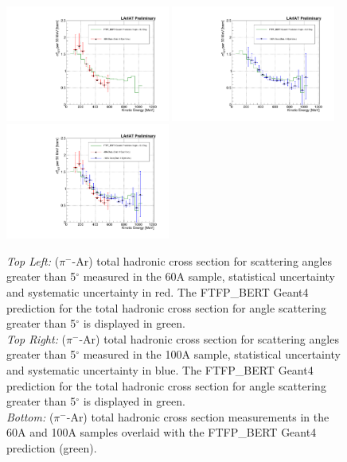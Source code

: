 \begin{figure}[htb]
\centering
\includegraphics[width=0.48\textwidth]{Chapter-6/Images/TheMoneyPlot60A.pdf}
\includegraphics[width=0.48\textwidth]{Chapter-6/Images/TheMoneyPlot100A.pdf}
\includegraphics[width=0.48\textwidth]{Chapter-6/Images/TheMoneyPlot.pdf}
\caption{ \emph{Top Left:} ($\pi^-$-Ar) total hadronic cross section for  scattering angles greater than 5$^\circ$ measured in the 60A sample, statistical uncertainty and systematic uncertainty in red. The FTFP\_BERT  Geant4 prediction for the total hadronic cross section for angle scattering greater than 5$^\circ$ is displayed in green. \\ 
\emph{Top Right:} ($\pi^-$-Ar) total hadronic cross section for  scattering angles greater than 5$^\circ$ measured in the 100A sample, statistical uncertainty and systematic uncertainty in blue. The FTFP\_BERT  Geant4 prediction for the total hadronic cross section for angle scattering greater than 5$^\circ$ is displayed in green.\\
\emph{Bottom:} ($\pi^-$-Ar) total hadronic cross section measurements in the 60A and 100A samples overlaid with the  FTFP\_BERT Geant4 prediction (green).}
\label{fig:FinalXSPion}
\end{figure}

